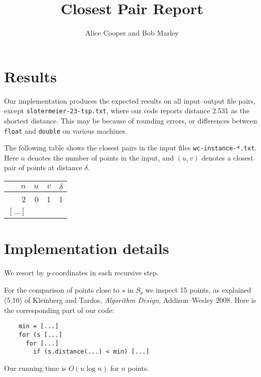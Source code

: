 \documentclass{tufte-handout}
\title{Closest Pair Report}
\author{Alice Cooper and Bob Marley}
\begin{document}
  \maketitle

  \section{Results}

  Our implementation produces the expected results on all input--output file pairs, except {\tt slotermeier-23-tsp.txt}, where our code reports distance 2.531 as the shortest distance.
  This may be because of rounding errors, or differences between {\tt float} and {\tt double} on various machines.

  The following table shows the closest pairs in the input files {\tt wc-instance-*.txt}.
  Here $n$ denotes the number of points in the input,
  and $(u,v)$ denotes a closest pair of points at distance $\delta$.

  \bigskip\noindent
  \begin{tabular}{rrrr}\toprule
    $n$ & $u$ & $v$ & $\delta$ \\\midrule
    2 & 0 & 1 & 1 \\
    $[\ldots]$ \\\bottomrule
  \end{tabular}


  \section{Implementation details}

  We resort by $y$-coordinates in each recursive step.

  For the comparison of points close to $s$ in $S_y$ we inspect 15 points,
  as explained (5.10) of Kleinberg and Tardos, \emph{Algorithm Design}, Addison--Wesley 2008.
  Here is the corresponding part of our code:
  \begin{verbatim}
    min = [...]
    for (s [...]
      for [...]
        if (s.distance(...) < min) [...]
  \end{verbatim}

  Our running time is $O(n\log n)$ for $n$ points.
\end{document}
